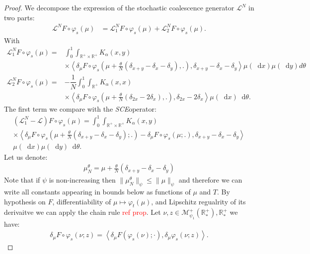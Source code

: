 \documentclass[11pt,a4paper]{article}
\newcommand{\RR}{\mathbb{R}}
\newcommand{\RRP}{\mathbb{R}^+_*}
\newcommand{\MC}{\mathcal{M}}
\newcommand{\LC}{\mathcal{L}}
\newcommand{\SCE}{\emph{SCE}}
\newcommand{\red}[1]{\textcolor{red}{#1}}
\newcommand{\brac}[1]{\left\langle#1\right\rangle}
\newcommand{\dd}{\mathop{}\!\mathrm{d}}
\begin{document}
\begin{proof}
    We decompose the expression of the stochastic coalescence generator $\LC^N$ in two parts:
    \begin{align*}
        \LC^N F\circ \varphi_s(\mu) &= \LC_1^N F\circ \varphi_s(\mu) + \LC_2^N F\circ \varphi_s(\mu).
    \end{align*}
    With
    \begin{align*}
            \LC_1^N F\circ \varphi_s(\mu) =& \int_0^1 \int_{\RR^+ \times \RR^+} K_{\alpha}(x,y) \\
            &\times \left\langle  \delta_\mu F\circ \varphi_s\left(\mu + \frac{\theta}{N}\left(\delta_{x + y} - \delta_x - \delta_y \right),.\right),\delta_{x+y} - \delta_x - \delta_y\right\rangle\mu(\dd x)\mu(\dd y)d\theta \\
            \LC_2^N F\circ \varphi_s(\mu) =& -\dfrac{1}{N}\int_0^1\int_{\RR^+} K_{\alpha}(x,x) \\
            &\times \left\langle  \delta_\mu F\circ \varphi_s\left(\mu + \frac{\theta}{N}\left(\delta_{2x} - 2\delta_x \right),.\right),\delta_{2x} - 2\delta_x \right\rangle\mu(\dd x)\dd\theta.
    \end{align*}
    The first term we compare with the \SCE operator:
    \begin{multline*}
        \left(\LC_1^N - \LC\right)F\circ \varphi_s (\mu) 
        = \int_0^1 \int_{\RR^+ \times \RR^+} K_{\alpha}(x,y)\\
        \times  \left\langle  \delta_\mu F\circ \varphi_s\left(\mu + \frac{\theta}{N}\left(\delta_{x + y} - \delta_x - \delta_y \right);.\right)- \delta_\mu F\circ \varphi_s\left(\mu;.\right),\delta_{x+y} - \delta_x - \delta_y\right\rangle \\
        \mu(\dd x)\mu(\dd y)\dd \theta .
    \end{multline*}
    Let us denote:
    \begin{align*}
        \mu^\theta_N = \mu + \frac{\theta}{N}\left(\delta_{x + y} - \delta_x - \delta_y \right)
    \end{align*}
    Note that if $\psi$ is non-increasing then $\|\mu^\theta_N\|_{\psi} \leq \|\mu\|_{\psi}$ and therefore we can write all constants appearing in bounds below as functions of $\mu$ and $T$. By hypothesis on $F$, differentiability of $\mu \mapsto \varphi_t(\mu)$, and Lipschitz regualrity of its derivaitve we can apply the chain rule \red{ref prop}. Let $\nu,z \in \MC^+_{\psi_1}(\RRP),\RRP$ we have:
    \begin{align*}
        \delta_\mu F\circ \varphi_s(\nu;z) = \brac{\delta_\mu F(\varphi_s(\nu);\cdot),\delta_\mu \varphi_s (\nu;z)}.

\end{align*}
\end{proof}
\end{document}
